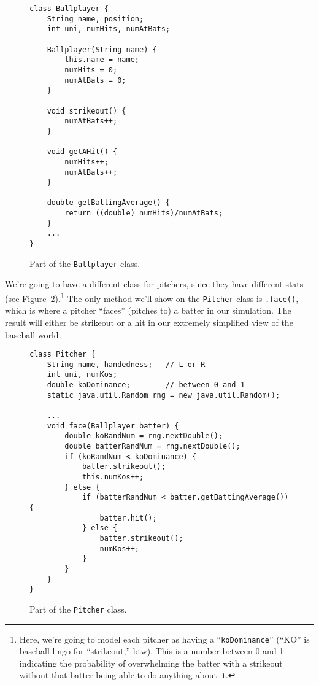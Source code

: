 \begin{figure}
\begin{Verbatim}[fontsize=\scriptsize,samepage=true,frame=single]
class Ballplayer {
    String name, position;
    int uni, numHits, numAtBats;

    Ballplayer(String name) {
        this.name = name;
        numHits = 0;
        numAtBats = 0;
    }

    void strikeout() {
        numAtBats++;
    }

    void getAHit() {
        numHits++;
        numAtBats++;
    }

    double getBattingAverage() {
        return ((double) numHits)/numAtBats;
    }
    ...
}
\end{Verbatim}
\caption{Part of the \texttt{Ballplayer} class.}
\label{fig:BallplayerCode}
\end{figure}

We're going to have a different class for pitchers, since they have different
stats (see Figure~\ref{fig:PitcherCode}).\footnote{Here, we're going to model
each pitcher as having a ``\texttt{koDominance}'' (``KO'' is baseball lingo for
``strikeout,'' btw). This is a number between 0 and 1 indicating the
probability of overwhelming the batter with a strikeout without that batter
being able to do anything about it.} The only method we'll show on the
\texttt{Pitcher} class is \texttt{.face()}, which is where a pitcher ``faces''
(pitches to) a batter in our simulation. The result will either be strikeout
or a hit in our extremely simplified view of the baseball world.

\begin{figure}
\begin{Verbatim}[fontsize=\scriptsize,samepage=true,frame=single]
class Pitcher {
    String name, handedness;   // L or R
    int uni, numKos;
    double koDominance;        // between 0 and 1
    static java.util.Random rng = new java.util.Random();

    ...
    void face(Ballplayer batter) {
        double koRandNum = rng.nextDouble();
        double batterRandNum = rng.nextDouble();
        if (koRandNum < koDominance) {
            batter.strikeout();
            this.numKos++;
        } else {
            if (batterRandNum < batter.getBattingAverage()) {
                batter.hit();
            } else {
                batter.strikeout();
                numKos++;
            }
        }
    }
}
\end{Verbatim}
\caption{Part of the \texttt{Pitcher} class.}
\label{fig:PitcherCode}
\end{figure}

